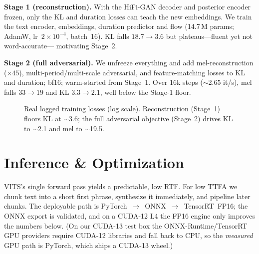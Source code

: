 \documentclass[10pt,twocolumn]{article}
\begin{document}
\textbf{Stage 1 (reconstruction).} With the HiFi-GAN decoder and posterior encoder
frozen, only the KL and duration losses can teach the new embeddings. We train the text
encoder, embeddings, duration predictor and flow (14.7\,M params; AdamW, lr~$2{\times}10^{-4}$,
batch~16). KL falls $18.7\rightarrow3.6$ but plateaus---fluent yet not word-accurate---%
motivating Stage~2.

\textbf{Stage 2 (full adversarial).} We unfreeze everything and add mel-reconstruction
($\times45$), multi-period/multi-scale adversarial, and feature-matching losses to KL and
duration; bf16; warm-started from Stage~1. Over 16k steps ($\sim$2.65 it/s), mel falls
$33\rightarrow19$ and KL $3.3\rightarrow2.1$, well below the Stage-1 floor.

\begin{figure}[t]\centering
{}
\caption{Real logged training losses (log scale). Reconstruction (Stage~1) floors KL at
$\sim$3.6; the full adversarial objective (Stage~2) drives KL to $\sim$2.1 and mel to
$\sim$19.5.}
\label{fig:loss}
\end{figure}

\section{Inference \& Optimization}
VITS's single forward pass yields a predictable, low RTF. For low TTFA we chunk text into
a short first phrase, synthesize it immediately, and pipeline later chunks. The deployable
path is PyTorch~$\rightarrow$~ONNX~$\rightarrow$~TensorRT~FP16; the ONNX export is validated,
and on a CUDA-12 L4 the FP16 engine only improves the numbers below. (On our CUDA-13 test
box the ONNX-Runtime/TensorRT GPU providers require CUDA-12 libraries and fall back to CPU,
so the \emph{measured} GPU path is PyTorch, which ships a CUDA-13 wheel.)
\end{document}
